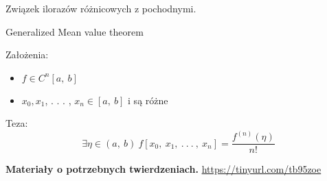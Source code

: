 \begin{frame}
Związek ilorazów różnicowych z pochodnymi.
\begin{block}
{Generalized Mean value theorem}

Założenia:
\begin{itemize}
\item $f\in C^{n}[a,\ b]$
\item $x_{0}, x_{1}$, . . . , $x_{n}\in[a,\ b] $ i są różne
\end{itemize}

Teza:
$$
\exists\eta\in(a,\ b)\ f[x_{0},\ x_{1},\ .\ .\ .\ ,\ x_{n}]=\frac{f^{(n)}(\eta)}{n!}
$$
\end{block}
\vspace{5mm}

\textbf{Materiały o potrzebnych twierdzeniach.} \url{https://tinyurl.com/tb95zoe}
\end{frame}

